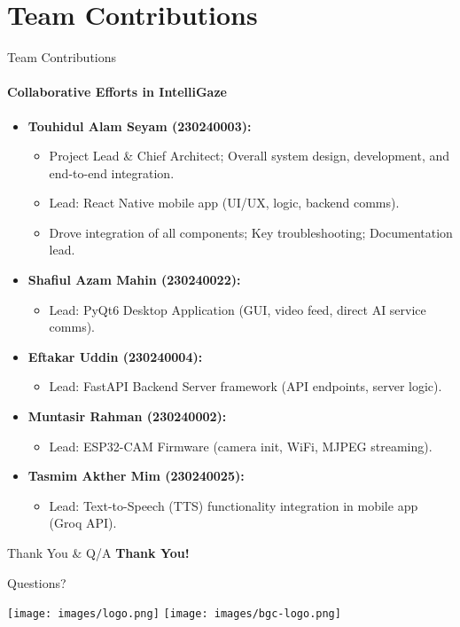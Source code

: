 \documentclass[10pt]{beamer}
\begin{document}
\section{Team Contributions}
\begin{frame}{Team Contributions}
    \framesubtitle{Collaborative Efforts in IntelliGaze}
    \begin{itemize}
        \item \textbf{Touhidul Alam Seyam (230240003):}
            \begin{itemize}
                \item Project Lead \& Chief Architect; Overall system design, development, and end-to-end integration.
                \item Lead: React Native mobile app (UI/UX, logic, backend comms).
                \item Drove integration of all components; Key troubleshooting; Documentation lead.
            \end{itemize}
        \item \textbf{Shafiul Azam Mahin (230240022):}
            \begin{itemize}
                \item Lead: PyQt6 Desktop Application (GUI, video feed, direct AI service comms).
            \end{itemize}
        \item \textbf{Eftakar Uddin (230240004):}
            \begin{itemize}
                \item Lead: FastAPI Backend Server framework (API endpoints, server logic).
            \end{itemize}
        \item \textbf{Muntasir Rahman (230240002):}
            \begin{itemize}
                \item Lead: ESP32-CAM Firmware (camera init, WiFi, MJPEG streaming).
            \end{itemize}
        \item \textbf{Tasmim Akther Mim (230240025):}
            \begin{itemize}
                \item Lead: Text-to-Speech (TTS) functionality integration in mobile app (Groq API).
            \end{itemize}
    \end{itemize}
    \vspace{0.2em} %
\end{frame}

\begin{frame}{Thank You \& Q/A}
    \centering
    \Huge \textbf{Thank You!}
    \vspace{2em}

    \Large Questions?
    \vspace{3em}

    \texttt{[image: images/logo.png]}
    \hspace{1cm}
    \texttt{[image: images/bgc-logo.png]}
    
\end{frame}
\end{document}
